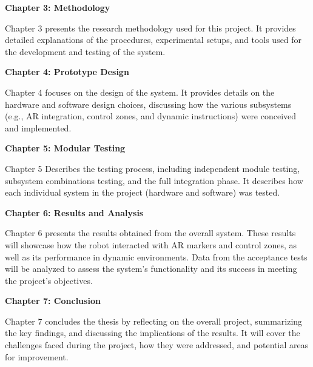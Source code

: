 \textbf{Chapter 3: Methodology}

Chapter 3 presents the research methodology used for this project. It provides detailed explanations of the procedures, experimental setups, and tools used for the development and testing of the system.

\textbf{Chapter 4: Prototype Design}

Chapter 4 focuses on the design of the system. It provides details on the hardware and software design choices, discussing how the various subsystems (e.g., AR integration, control zones, and dynamic instructions) were conceived and implemented. 

\textbf{Chapter 5: Modular Testing}

Chapter 5 Describes the testing process, including independent module testing, subsystem combinations testing, and the full integration phase. It describes how each individual system in the project (hardware and software) was tested.
 

\textbf{Chapter 6: Results and Analysis}

Chapter 6 presents the results obtained from the overall system. These results will showcase how the robot interacted with AR markers and control zones, as well as its performance in dynamic environments. Data from the acceptance tests will be analyzed to assess the system’s functionality and its success in meeting the project’s objectives.

\textbf{Chapter 7: Conclusion}

Chapter 7 concludes the thesis by reflecting on the overall project, summarizing the key findings, and discussing the implications of the results. It will cover the challenges faced during the project, how they were addressed, and potential areas for improvement. 


